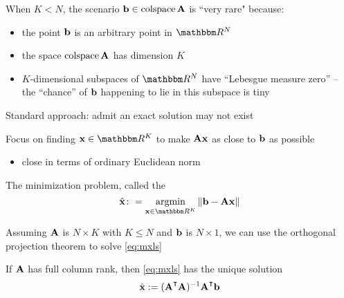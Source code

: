 \begin{frame}

     \vspace{2em}
    When $K < N$, the scenario ${\mathbf b} \in
    \operatorname{colspace} \mathbf A$ is ``very rare" because:
    \begin{itemize}
        \item the point ${\mathbf b}$ is an arbitrary point in $\RR^N$
        \item the space $ \operatorname{colspace} \mathbf A$ has dimension $K$
        \item $K$-dimensional subspaces of $\RR^N$ have 
        ``Lebesgue measure zero'' -- the ``chance'' of ${\mathbf b}$ happening to lie in this subspace is tiny  
    \end{itemize}
    
\end{frame}

\begin{frame}

     \vspace{2em}
    Standard approach: admit an exact solution may not
    exist
    
    \vspace{1em}
    Focus on finding $\boldx \in \RR^K$ to make $\mathbf A
    {\mathbf x}$ as close to ${\mathbf b}$ as possible
    \begin{itemize}
        \item close in terms of ordinary Euclidean norm
    \end{itemize}
    
    \vspace{1em}
    The minimization problem, called the 
    \begin{equation}
        \label{eq:mxls}
        \hat{\boldx} \colon = \argmin_{\boldx \in \RR^K} \| \boldb - \boldA \boldx \|
    \end{equation}
    
\end{frame}


\begin{frame}

     \vspace{2em}
    Assuming $\mathbf A$ is $N \times K$ with $K \leq N$ and ${\mathbf b}$ is $N \times 1$, 
    we can use  the orthogonal projection theorem to solve \eqref{eq:mxls}
    
    \vspace{.7em}
    \Thm{\eqref{ET-t:lssol}}
        If $\mathbf A$ has full column rank, then \eqref{eq:mxls} has the unique
        solution
        \begin{equation}
            \label{eq:dlse}
            \hboldx := (\boldA^\T \boldA)^{-1} \boldA^\T \boldb
        \end{equation}
    \end{frame}
    
